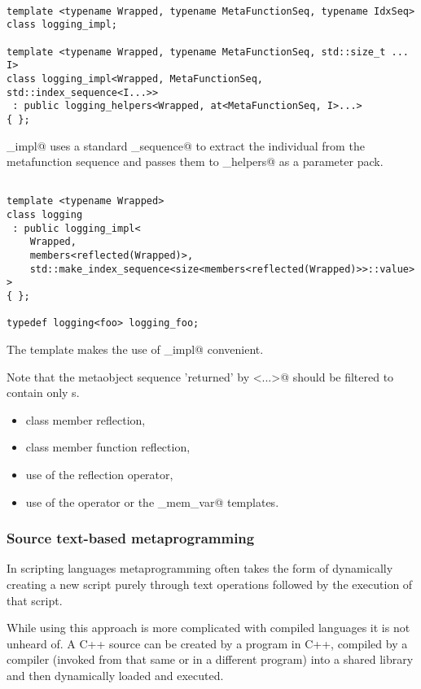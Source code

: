 \begin{verbatim}

template <typename Wrapped, typename MetaFunctionSeq, typename IdxSeq>
class logging_impl;

template <typename Wrapped, typename MetaFunctionSeq, std::size_t ... I>
class logging_impl<Wrapped, MetaFunctionSeq, std::index_sequence<I...>>
 : public logging_helpers<Wrapped, at<MetaFunctionSeq, I>...>
{ };

\end{verbatim}

\verb@logging_impl@ uses a standard \verb@index_sequence@ to extract the
individual  from the metafunction sequence and passes them
to \verb@logging_helpers@ as a parameter pack.


\begin{verbatim}

template <typename Wrapped>
class logging
 : public logging_impl<
	Wrapped,
	members<reflected(Wrapped)>,
	std::make_index_sequence<size<members<reflected(Wrapped)>>::value>
>
{ };

typedef logging<foo> logging_foo;

\end{verbatim}

The \verb@logging@ template makes the use of \verb@logging_impl@ convenient.

Note that the metaobject sequence 'returned' by \verb@members<...>@ should
be filtered to contain only s.

\begin{itemize}
\item{class member reflection,}
\item{class member function reflection,}
\item{use of the reflection operator,}
\item{use of the \verb@identifier@ operator or the \verb@named_mem_var@ templates.}
\end{itemize}

\subsubsection{Source text-based metaprogramming}

In scripting languages metaprogramming often takes the form of dynamically creating
a new script purely through text operations followed by the execution of that script.

While using this approach is more complicated with compiled languages it is not
unheard of. A C++ source can be created by a program in C++, compiled by a compiler
(invoked from that same or in a different program) into a shared library and then
dynamically loaded and executed.

